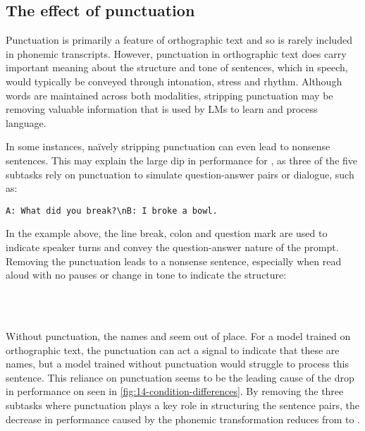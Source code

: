 \subsection{The effect of punctuation}
\label{sec:14-punctuation}

Punctuation is primarily a feature of orthographic text and so is rarely included in phonemic transcripts. However, punctuation in orthographic text does carry important meaning about the structure and tone of sentences, which in speech, would typically be conveyed through intonation, stress and rhythm. Although words are maintained across both modalities, stripping punctuation may be removing valuable information that is used by LMs to learn and process language. 

In some instances, na\"ively stripping punctuation can even lead to nonsense sentences. This may explain the large dip in performance for \blimpsupp, as three of the five subtasks rely on punctuation to simulate question-answer pairs or dialogue, such as:

\begin{center}
\texttt{A: What did you break?\textbackslash nB: I broke a bowl.}
\end{center}

In the example above, the line break, colon and question mark are used to indicate speaker turns and convey the question-answer nature of the prompt. Removing the punctuation leads to a nonsense sentence, especially when read aloud with no pauses or change in tone to indicate the structure:

\vspace{-1mm}
\begin{center}
~\textvisiblespace~~\textvisiblespace~~\textvisiblespace~~\textvisiblespace~~~~\textvisiblespace~~\textvisiblespace~~\textvisiblespace\\~~\textvisiblespace~~\textvisiblespace~~\textvisiblespace
\end{center}
\vspace{-1mm}

Without punctuation, the names  and  seem out of place. For a model trained on orthographic text, the punctuation can act a signal to indicate that these are names, but a model trained without punctuation would struggle to process this sentence. This reliance on punctuation seems to be the leading cause of the drop in performance on \blimpsupp seen in \cref{fig:14-condition-differences}. By removing the three subtasks where punctuation plays a key role in structuring the sentence pairs, the decrease in performance caused by the phonemic transformation reduces from  to .

